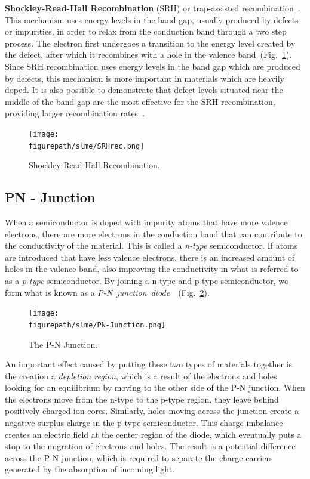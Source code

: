 \begin{refsection}
\textbf{Shockley-Read-Hall Recombination} (\gls{SRH}) or trap-assisted 
recombination~\cite{Shockley1952}\cite{Hall1952}. This mechanism uses energy 
levels in the band gap, usually produced by defects or impurities, in order to 
relax from the conduction band through a two step process. The electron first 
undergoes a transition to the energy level created by the defect, after which 
it recombines with a hole in the valence band~(Fig.~\ref{slme:fig-SRHrec}). 
Since \gls{SRH} recombination uses energy levels in the band gap which are produced 
by defects, this mechanism is more important in materials which are heavily 
doped. It is also possible to demonstrate that defect levels situated near the 
middle of the band gap are the most effective for the \gls{SRH} recombination, 
providing larger recombination rates~\cite{Green1981}. 
\begin{figure}[ht]  
\centering 
\texttt{[image: \\figurepath/slme/SRHrec.png]} 
\caption{\label{slme:fig-SRHrec}Shockley-Read-Hall Recombination.} 
\end{figure} 

\subsection{PN - Junction} 
 
When a semiconductor is doped with impurity atoms that have more valence 
electrons, there are more electrons in the conduction band that can contribute 
to the conductivity of the material. This is called a \textit{n-type} 
semiconductor. If atoms are introduced that have less valence electrons, there 
is an increased amount of holes in the valence band, also improving the  
conductivity in what is referred to as a \textit{p-type} semiconductor. By 
joining a n-type and p-type semiconductor, we form what is known as a 
\textit{P-N~junction~diode}~\cite{Shockley1949}~(Fig.~\ref{slme:fig-PNjunction}). 
 
\begin{figure}[ht]
\centering 
\captionsetup{width=0.8\textwidth}
\texttt{[image: \\figurepath/slme/PN-Junction.png]} 
\caption{\label{slme:fig-PNjunction} The P-N Junction. \cite{PNjunction}} 
\end{figure} 
 
An important effect caused by putting these two types of materials together is 
the creation a \textit{depletion region}, which is a result of the electrons 
and holes looking for an equilibrium by moving to the other side of the P-N 
junction. When the electrons move from the n-type to the p-type region, they 
leave behind positively charged ion cores. Similarly, holes moving across the 
junction create a negative surplus charge in the p-type semiconductor. This 
charge imbalance creates an electric field at the center region of the diode, 
which eventually puts a stop to the migration of electrons and holes. The 
result is a potential difference across the P-N junction, which is required to 
separate the charge carriers generated by the absorption of incoming light. 
 

\end{refsection}
